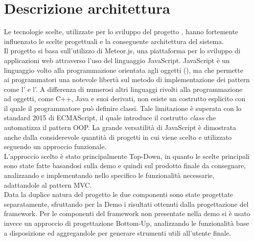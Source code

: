 \section{Descrizione architettura}
Le tecnologie scelte, utilizzate per lo sviluppo del progetto \ProjectName{}, hanno fortemente influenzato le scelte progettuali e la conseguente architettura del sistema.\\

Il progetto si basa sull'utilizzo di Meteor.js, una piattaforma per lo sviluppo di applicazioni web attraverso l'uso del linguaggio JavaScript. JavaScript è un linguaggio volto alla programmazione orientata agli oggetti (), ma che permette ai programmatori una notevole libertà sul metodo di implementazione dei pattern come l' e l'. A differenza di numerosi altri linguaggi rivolti alla programmazione ad oggetti, come C++, Java e suoi derivati, non esiste un costrutto esplicito con il quale il programmatore può definire classi. Tale limitazione è superata con lo standard 2015 di ECMAScript, il quale introduce il costrutto \textit{class} che automatizza il pattern OOP. La grande versatilità di JavaScript è dimostrata anche dalla considerevole quantità di progetti in cui viene scelto e utilizzato seguendo un approccio funzionale.\\

L'approccio scelto è stato principalmente Top-Down, in quanto le scelte principali sono state fatte basandosi sulla demo \DemoName{} e quindi sul prodotto finale da consegnare, analizzando e implementando nello specifico le funzionalità necessarie, adattandole al pattern MVC.\\

Data la duplice natura del progetto le due componenti sono state progettate separatamente, sfruttando per la Demo i risultati ottenuti dalla progettazione del framework. Per le componenti del framework non presentate nella demo si è usato invece un approccio di progettazione Bottom-Up, analizzando le funzionalità base a disposizione ed aggregandole per generare strumenti utili all'utente finale.